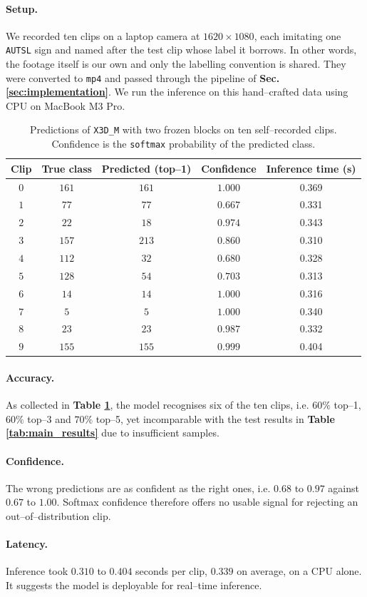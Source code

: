 \paragraph{Setup.} We recorded ten clips on a laptop camera at $1620\times1080$, each imitating one \texttt{AUTSL} sign and named after the test clip whose label it borrows.
In other words, the footage itself is our own and only the labelling convention is shared.
They were converted to \texttt{mp4} and passed through the pipeline of \textbf{Sec. \ref{sec:implementation}}. We run the inference on this hand–crafted data using CPU on MacBook M3 Pro.

\begin{table}[H]
\centering\small
\begin{tabular}{@{}c c c c c@{}}
\toprule
\textbf{Clip} & \textbf{True class} & \textbf{Predicted (top–1)} & \textbf{Confidence} & \textbf{Inference time (s)} \\
\midrule
$0$ & $161$ & $161$ & $1.000$ & 0.369 \\
$1$ & $77$  & $77$  & $0.667$ & 0.331\\
$2$ & $22$  & $18$  & $0.974$ & 0.343\\
$3$ & $157$ & $213$ & $0.860$ & 0.310\\
$4$ & $112$ & $32$  & $0.680$ & 0.328\\
$5$ & $128$ & $54$  & $0.703$ & 0.313\\
$6$ & $14$  & $14$  & $1.000$ & 0.316\\
$7$ & $5$   & $5$   & $1.000$ & 0.340\\
$8$ & $23$  & $23$  & $0.987$ & 0.332\\
$9$ & $155$ & $155$ & $0.999$ & 0.404\\
\bottomrule
\end{tabular}
\caption{Predictions of \texttt{X3D\_M} with two frozen blocks on ten self--recorded clips. Confidence is the \texttt{softmax} probability of the predicted class.}
\label{tab:custom}
\end{table}

\paragraph{Accuracy.} As collected in \textbf{Table \ref{tab:custom}}, the model recognises six of the ten clips, i.e. $60\%$ top--1, $60\%$ top--3 and $70\%$ top--5, yet incomparable with the test results in \textbf{Table \ref{tab:main_results}} due to insufficient samples.

\paragraph{Confidence.} The wrong predictions are as confident as the right ones, i.e. $0.68$ to $0.97$ against $0.67$ to $1.00$.
Softmax confidence therefore offers no usable signal for rejecting an out--of--distribution clip.

\paragraph{Latency.} Inference took $0.310$ to $0.404$ seconds per clip, $0.339$ on average, on a CPU alone.
It suggests the model is deployable for real–time inference.
